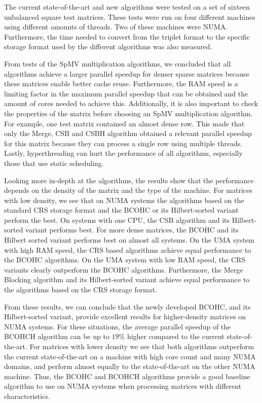 \documentclass{siamart220329}
\begin{document}
The current state-of-the-art and new algorithms were tested on a set of sixteen unbalanced square test matrices. These tests were run on four different machines using different amounts of threads. Two of these machines were NUMA. Furthermore, the time needed to convert from the triplet format to the specific storage format used by the different algorithms was also measured.

From tests of the SpMV multiplication algorithms, we concluded that all algorithms achieve a larger parallel speedup for denser sparse matrices because these matrices enable better cache reuse. Furthermore, the RAM speed is a limiting factor in the maximum parallel speedup that can be obtained and the amount of cores needed to achieve this. Additionally, it is also important to check the properties of the matrix before choosing an SpMV multiplication algorithm. For example, one test matrix contained an almost dense row. This made that only the Merge, CSB and CSBH algorithm obtained a relevant parallel speedup for this matrix because they can process a single row using multiple threads. Lastly, hyperthreading can hurt the performance of all algorithms, especially those that use static scheduling.

Looking more in-depth at the algorithms, the results show that the performance depends on the density of the matrix and the type of the machine. For matrices with low density, we see that on NUMA systems the algorithms based on the standard CRS storage format and the BCOHC or its Hilbert-sorted variant perform the best. On systems with one CPU, the CSB algorithm and its Hilbert-sorted variant performs best. For more dense matrices, the BCOHC and its Hilbert sorted variant performs best on almost all systems. On the UMA system with high RAM speed, the CRS based algorithms achieve equal performance to the BCOHC algorithms. On the UMA system with low RAM speed, the CRS variants clearly outperform the BCOHC algorithms. Furthermore, the Merge Blocking algorithm and its Hilbert-sorted variant achieve equal performance to the algorithms based on the CRS storage format.

From these results, we can conclude that the newly developed BCOHC, and its Hilbert-sorted variant, provide excellent results for higher-density matrices on NUMA systems. For these situations, the average parallel speedup of the BCOHCH algorithm can be up to $19\%$ higher compared to the current state-of-the-art. For matrices with lower density we see that both algorithms outperform the current state-of-the-art on a machine with high core count and many NUMA domains, and perform almost equally to the state-of-the-art on the other NUMA machine. Thus, the BCOHC and BCOHCH algorithms provide a good baseline algorithm to use on NUMA systems when processing matrices with different characteristics.
\end{document}
